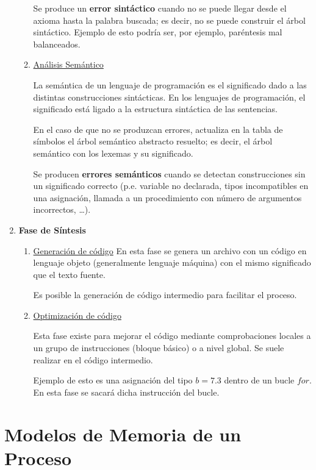 \begin{enumerate}
\begin{enumerate}
        Se produce un \textbf{error sintáctico} cuando no se puede llegar desde el axioma hasta la palabra buscada; es decir, no se puede construir el árbol sintáctico. Ejemplo de esto podría ser, por ejemplo, paréntesis mal balanceados.




        \item \underline{Análisis Semántico}

        La semántica de un lenguaje de programación es el significado dado a las distintas construcciones sintácticas. En los lenguajes de programación, el significado está ligado a la estructura sintáctica de las sentencias.

        En el caso de que no se produzcan errores, actualiza en la tabla de símbolos el árbol semántico abstracto resuelto; es decir, el árbol semántico con los lexemas y su significado.

        Se producen \textbf{errores semánticos} cuando se detectan construcciones sin un significado correcto (p.e. variable no declarada, tipos incompatibles en una asignación, llamada a un procedimiento con número de argumentos incorrectos, \dots).
    \end{enumerate}
    \item \textbf{Fase de Síntesis}
    \begin{enumerate}
        \item \underline{Generación de código}
        En esta fase se genera un archivo con un código en lenguaje objeto (generalmente lenguaje máquina) con el mismo significado que el texto fuente.

        Es posible la generación de código intermedio para facilitar el proceso.

        \item \underline{Optimización de código}

        Esta fase existe para mejorar el código mediante comprobaciones locales a un grupo de instrucciones (bloque básico) o a nivel global. Se suele realizar en el código intermedio.

        Ejemplo de esto es una asignación del tipo $b=7.3$ dentro de un bucle $for$. En esta fase se sacará dicha instrucción del bucle.
    \end{enumerate}
\end{enumerate}


\section{Modelos de Memoria de un Proceso}
